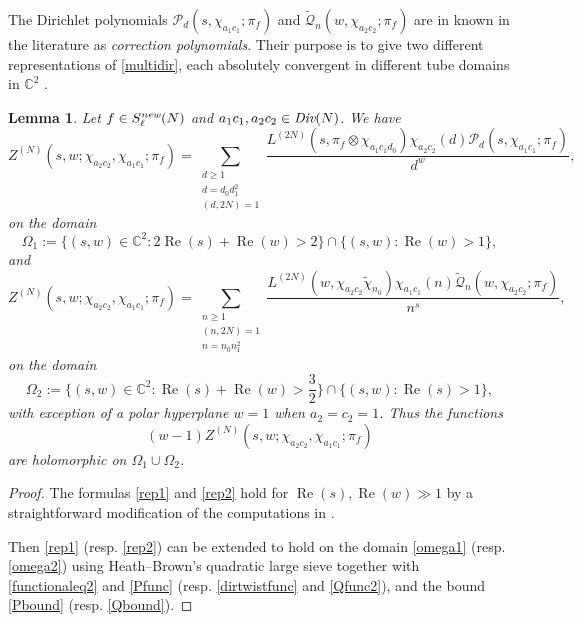 \documentclass[12pt,reqno]{amsart}
\theoremstyle{plain}
\newtheorem{lemma}{Lemma}
\theoremstyle{remark}
\renewcommand{\Re}{\operatorname{Re}}
\numberwithin{equation}{section}
\numberwithin{lemma}{section}
\numberwithin{theorem}{section}
\numberwithin{prop}{section}
\numberwithin{remark}{section}
\begin{document}
The Dirichlet polynomials $ \mathcal{P}_d(s,\chi_{a_1 c_1};\pi_f)$ and $\widetilde{\mathcal{Q}}_{n}(w,\chi_{a_2 c_2};\pi_f)$
 are in known in the literature as \emph{correction polynomials}. Their purpose 
 is to give two different representations 
of \eqref{multidir}, each absolutely convergent in different tube domains in $\mathbb{C}^2$ \cite{BFH,HK}.
\begin{lemma} \label{rep1lem}
Let $f \in S^{\emph{new}}_{\ell}(N)$ and $a_1 c_1, a_2 c_2 \in \emph{Div}(N)$.
We have 
\begin{equation} \label{rep1}
Z^{(N)}(s,w;\chi_{a_2 c_2}, \chi_{a_1 c_1};\pi_f)=\sum_{\substack{d \geq 1 \\ d=d_0 d_1^2  \\ (d,2N)=1}}
 \frac{L^{(2N)}(s,\pi_f \otimes \chi_{a_1 c_1 d_0}) \chi_{a_2 c_2}(d) \mathcal{P}_d(s,\chi_{a_1 c_1};\pi_f)}{d^w},
\end{equation}
on the domain 
\begin{equation} \label{omega1}
\Omega_1:=\{(s,w) \in \mathbb{C}^2: 2 \Re(s)+\Re(w)>2 \} \cap \{(s,w): \Re(w)>1 \},
\end{equation}
and 
\begin{equation} \label{rep2}
Z^{(N)}(s,w; \chi_{a_2 c_2}, \chi_{a_1 c_1};\pi_f)=
\sum_{\substack{n \geq 1 \\ (n,2N)=1 \\ n=n_0 n_1^2}}
 \frac{L^{(2N)}(w, \chi_{a_2 c_2} \widetilde{\chi}_{n_0}) 
\chi_{a_1 c_1}(n) \widetilde{\mathcal{Q}}_{n}(w,\chi_{a_2 c_2};\pi_f)}{n^s},
\end{equation} 
on the domain 
\begin{equation} \label{omega2}
\Omega_2:=\Big \{(s,w) \in \mathbb{C}^2: \Re(s)+\Re(w)>\frac{3}{2}  \Big \} \cap \{(s,w): \Re(s)>1 \},
\end{equation}
with exception of a polar hyperplane $w=1$ when $a_2=c_2=1$. 
Thus the functions
\begin{equation} \label{holintermed}
(w-1) Z^{(N)}(s,w;\chi_{a_2 c_2}, \chi_{a_1 c_1};\pi_f) 
\end{equation}
are holomorphic on $\Omega_1 \cup \Omega_2$. 
\end{lemma}
\begin{proof}

The formulas \eqref{rep1} and \eqref{rep2} hold for $\Re(s),\Re(w) \gg 1$
by a straightforward modification of the computations in \cite[Section~3]{Di}. 

Then
\eqref{rep1} (resp. \eqref{rep2}) can be extended to hold on the domain \eqref{omega1} 
(resp. \eqref{omega2}) using Heath--Brown's quadratic large sieve \cite[Corollary~3]{HB}
together with \eqref{functionaleq2} and \eqref{Pfunc} (resp. \eqref{dirtwistfunc} and 
\eqref{Qfunc2}), and the bound
\eqref{Pbound} (resp. \eqref{Qbound}). 
 
\end{proof}
\end{document}
